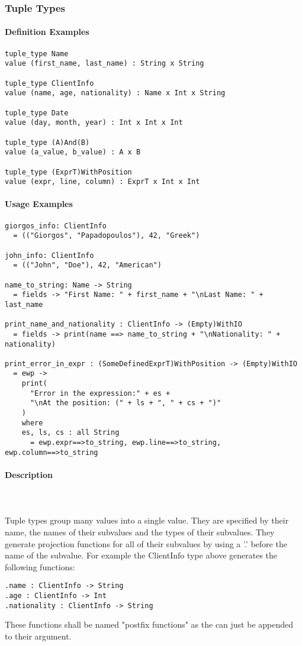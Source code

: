 \documentclass{article}
\def\pend{\mbox{} \\\\}
\begin{document}
\subsubsection{Tuple Types}

\paragraph{Definition Examples}

\begin{verbatim}
tuple_type Name
value (first_name, last_name) : String x String

tuple_type ClientInfo
value (name, age, nationality) : Name x Int x String

tuple_type Date
value (day, month, year) : Int x Int x Int

tuple_type (A)And(B)
value (a_value, b_value) : A x B

tuple_type (ExprT)WithPosition
value (expr, line, column) : ExprT x Int x Int
\end{verbatim}

\paragraph{Usage Examples}

\begin{verbatim}
giorgos_info: ClientInfo
  = (("Giorgos", "Papadopoulos"), 42, "Greek")

john_info: ClientInfo
  = (("John", "Doe"), 42, "American")

name_to_string: Name -> String
  = fields -> "First Name: " + first_name + "\nLast Name: " + last_name

print_name_and_nationality : ClientInfo -> (Empty)WithIO
  = fields -> print(name ==> name_to_string + "\nNationality: " + nationality)

print_error_in_expr : (SomeDefinedExprT)WithPosition -> (Empty)WithIO
  = ewp ->
    print(
      "Error in the expression:" + es +
      "\nAt the position: (" + ls + ", " + cs + ")"
    )
    where
    es, ls, cs : all String
      = ewp.expr==>to_string, ewp.line==>to_string, ewp.column==>to_string
\end{verbatim}

\paragraph{Description}\pend
Tuple types group many values into a single value. They are specified by their name,
the names of their subvalues and the types of their subvalues. They generate 
projection functions for all of their subvalues by using a '.' before the name of 
the subvalue. For example the ClientInfo type above generates the following 
functions:
\begin{verbatim}
.name : ClientInfo -> String
.age : ClientInfo -> Int
.nationality : ClientInfo -> String
\end{verbatim}
These functions shall be named "postfix functions" as the can just be appended to
their argument.
\end{document}
